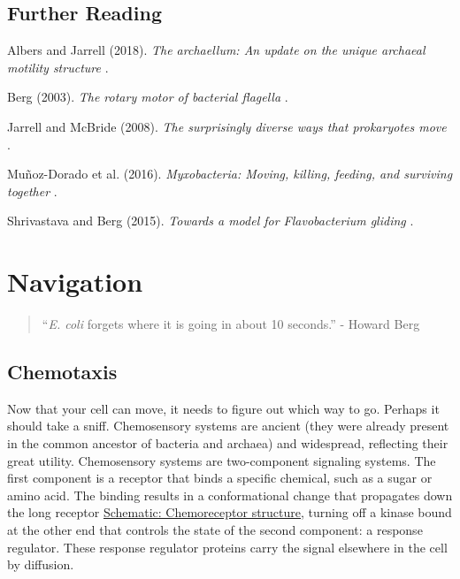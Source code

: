 \documentclass[]{tufte-book}
\begin{document}
\hypertarget{further-reading-5}{%
\section{Further Reading}\label{further-reading-5}}

Albers and Jarrell (2018). \emph{The archaellum: An update on the unique archaeal motility structure} \citep{albers2018}.

Berg (2003). \emph{The rotary motor of bacterial flagella} \citep{berg2003}.

Jarrell and McBride (2008). \emph{The surprisingly diverse ways that prokaryotes move} \citep{jarrell2008}.

Muñoz-Dorado et al. (2016). \emph{Myxobacteria: Moving, killing, feeding, and surviving together} \citep{munoz-dorado2016}.

Shrivastava and Berg (2015). \emph{Towards a model for Flavobacterium gliding} \citep{shrivastava2015}.

\hypertarget{navigation}{%
\chapter{Navigation}\label{navigation}}

\begin{quote}
``\emph{E. coli} forgets where it is going in about 10 seconds.''
- Howard Berg \citep{berg1988}
\end{quote}

\hypertarget{chemotaxis}{%
\section{Chemotaxis}\label{chemotaxis}}

Now that your cell can move, it needs to figure out which way to go. Perhaps it should take a sniff. Chemosensory systems are ancient (they were already present in the common ancestor of bacteria and archaea) and widespread, reflecting their great utility. Chemosensory systems are two-component signaling systems. The first component is a receptor that binds a specific chemical, such as a sugar or amino acid. The binding results in a conformational change that propagates down the long receptor \protect\hyperlink{Chemoreceptor_structure}{Schematic: Chemoreceptor structure}, turning off a kinase bound at the other end that controls the state of the second component: a response regulator. These response regulator proteins carry the signal elsewhere in the cell by diffusion.
\end{document}
